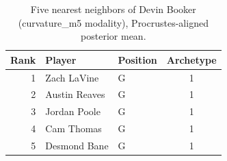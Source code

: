 \begin{table}[htbp]
  \centering\small
  \begin{tabular}{rllc}
    \toprule
    Rank & Player & Position & Archetype \\
    \midrule
    1 & Zach LaVine & G & 1 \\
    2 & Austin Reaves & G & 1 \\
    3 & Jordan Poole & G & 1 \\
    4 & Cam Thomas & G & 1 \\
    5 & Desmond Bane & G & 1 \\
    \bottomrule
  \end{tabular}
  \caption{Five nearest neighbors of Devin Booker (curvature_m5 modality), Procrustes-aligned posterior mean.}
  \label{tab:Devin_Booker_neighbors_curvature_m5}
\end{table}

